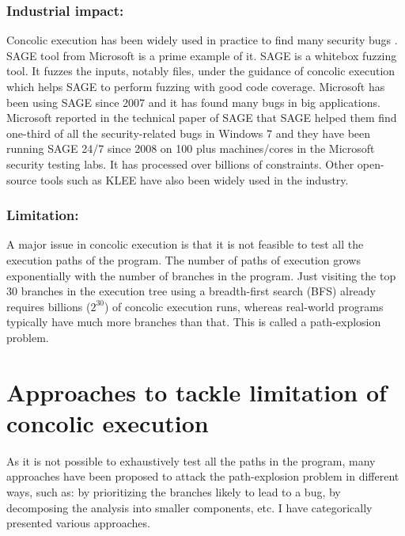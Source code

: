 \documentclass[ runningheads,
               a4paper]{llncs}
\begin{document}
\subsubsection{Industrial impact:}
Concolic execution has been widely used in practice to find many security bugs \cite{godefroid2008automated, kim2020hfl, kim2022fuzzusb, pham2016model}. SAGE \cite{godefroid2012sage} tool from Microsoft is a prime example of it. SAGE is a whitebox fuzzing tool. It fuzzes the inputs, notably files,
under the guidance of concolic execution which helps SAGE to perform fuzzing with good code coverage. Microsoft has been using SAGE since 2007 and it has found many bugs in big applications. Microsoft reported in the technical paper of SAGE \cite{godefroid2012sage} that SAGE helped them find one-third of all the security-related bugs in Windows 7 and they have been running SAGE 24/7 since 2008 on 100 plus machines/cores in the Microsoft security testing labs. It has processed over billions of constraints. Other open-source tools such as KLEE \cite{cadar2008klee} have also been widely used in the industry.


\subsubsection{Limitation:}
A major issue in concolic execution is that it is not feasible to test all the execution paths of the program. The number of paths of execution grows exponentially with the number of branches in the program. Just visiting the top 30 branches in the execution tree using a breadth-first search (BFS) already requires billions (\(2^{30}\)) of concolic execution runs, whereas real-world programs typically have much more branches than that. This is called a path-explosion problem.






\section{Approaches to tackle limitation of concolic execution}
As it is not possible to exhaustively test all the paths in the program, many approaches have been proposed \cite{sabbaghi2020systematic} to attack the path-explosion problem in different ways, such as: by prioritizing the branches likely to lead to a bug, by decomposing the analysis into smaller components, etc. I have categorically presented various approaches.
\end{document}
